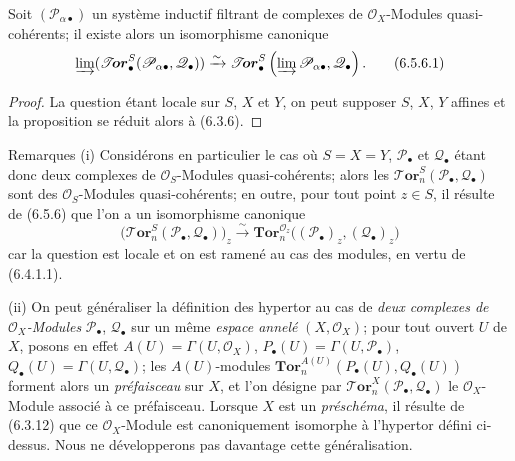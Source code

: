 \begin{proposition}[6.5.6]
Soit $(\mathscr P_{\alpha\bullet})$ un système inductif filtrant de complexes
de $\mathscr O_X$-Modules quasi-cohérents; il existe alors un isomorphisme
canonique
\[
  \varinjlim
  (\boldsymbol{\mathscr{T}\!or}_\bullet^S
  (\mathscr P_{\alpha\bullet},\mathscr Q_\bullet))
  \xrightarrow{\sim}
  \boldsymbol{\mathscr{T}\!or}_\bullet^S
  \left(\varinjlim\mathscr P_{\alpha\bullet},\mathscr Q_\bullet\right).
  \tag{6.5.6.1}\label{III.6.5.6.1.fr}
\]
\end{proposition}

\begin{proof}
La question étant locale sur $S$, $X$ et $Y$, on peut supposer $S$, $X$, $Y$
affines et la proposition se réduit alors à (6.3.6).
\end{proof}

\begin{namedtheorem}[6.5.7]{Remarques}
\textnormal{(i)} Considérons en particulier le cas où $S=X=Y$,
$\mathscr P_\bullet$ et $\mathscr Q_\bullet$ étant donc deux complexes de
$\mathscr O_S$-Modules quasi-cohérents; alors les
$\boldsymbol{\mathscr{T}\!or}_n^S(\mathscr P_\bullet,\mathscr Q_\bullet)$ sont des
$\mathscr O_S$-Modules quasi-cohérents; en outre, pour tout point $z\in S$, il
résulte de (6.5.6) que l'on a un isomorphisme canonique
\[
  \bigl(\boldsymbol{\mathscr{T}\!or}_n^S
    (\mathscr P_\bullet,\mathscr Q_\bullet)\bigr)_z
  \xrightarrow{\sim}
  \mathbf{Tor}_n^{\mathscr O_z}
  \bigl((\mathscr P_\bullet)_z,(\mathscr Q_\bullet)_z\bigr)
  \tag{6.5.7.1}\label{III.6.5.7.1.fr}
\]
car la question est locale et on est ramené au cas des modules, en vertu de
(6.4.1.1).

\textnormal{(ii)} On peut généraliser la définition des hypertor au cas de
\emph{deux complexes de $\mathscr O_X$-Modules} $\mathscr P_\bullet$,
$\mathscr Q_\bullet$ sur un même \emph{espace annelé} $(X,\mathscr O_X)$; pour tout
ouvert $U$ de $X$, posons en effet
$A(U)=\Gamma(U,\mathscr O_X)$,
$P_\bullet(U)=\Gamma(U,\mathscr P_\bullet)$,
$Q_\bullet(U)=\Gamma(U,\mathscr Q_\bullet)$; les $A(U)$-modules
$\mathbf{Tor}_n^{A(U)}(P_\bullet(U),Q_\bullet(U))$
forment alors un \emph{préfaisceau} sur $X$, et l'on désigne par
$\boldsymbol{\mathscr{T}\!or}_n^X(\mathscr P_\bullet,\mathscr Q_\bullet)$ le
$\mathscr O_X$-Module associé à ce préfaisceau. Lorsque $X$ est un \emph{préschéma},
il résulte de (6.3.12) que ce $\mathscr O_X$-Module est canoniquement isomorphe
à l'hypertor défini ci-dessus. Nous ne développerons pas davantage cette
généralisation.
\end{namedtheorem}


